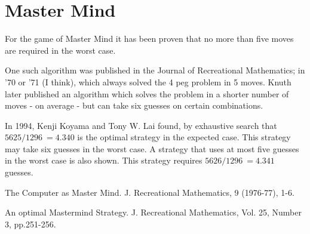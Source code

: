 \section{Master Mind}

    For the game of Master Mind it has been proven that no more than
    five moves are required in the worst case.

    One such algorithm was published in the Journal of Recreational
    Mathematics; in '70 or '71 (I think), which always solved the
    4 peg problem in 5 moves. Knuth later published an algorithm which
    solves the problem in a shorter number of moves - on average - but can
    take six guesses on certain combinations.

    In 1994, Kenji Koyama and Tony W. Lai found, by exhaustive search
    that $5625/1296~=4.340$ is the optimal strategy in the expected
    case. This strategy may take six guesses in the worst case.
    A strategy that uses at most five guesses in the worst case
    is also shown. This strategy requires $5626/1296~=4.341$ guesses.


\Ref

            {The Computer as Master Mind.}
            {J. Recreational Mathematics,}
            { 9 (1976-77), 1-6.}

            {An optimal Mastermind Strategy.}
            {J. Recreational Mathematics,}
            {Vol. 25, Number 3, pp.251-256.}

